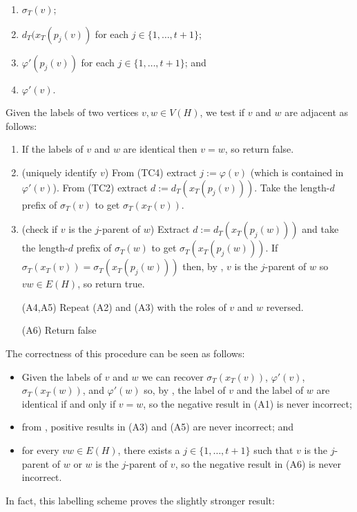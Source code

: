 \documentclass[kpfonts]{patmorin}
\begin{document}
\begin{enumerate}[(TC1)]
  \item $\sigma_T(v)$;
  \item $d_T(x_T(p_j(v))$ for each $j\in\{1,\ldots,t+1\}$; 
  \item $\varphi'(p_j(v))$ for each $j\in\{1,\ldots,t+1\}$; and
  \item $\varphi'(v)$.
\end{enumerate}

Given the labels of two vertices $v,w\in V(H)$, we test if $v$ and $w$ are adjacent as follows:
\begin{enumerate}[({A}1)]
  \item If the labels of $v$ and $w$ are identical then $v=w$, so return false.
  
  \item (uniquely identify $v$) From (TC4) extract $j:=\varphi(v)$ (which is contained in $\varphi'(v)$).  From (TC2) extract $d:=d_T(x_T(p_j(v)))$. Take the length-$d$ prefix of $\sigma_T(v)$ to get $\sigma_T(x_T(v))$.

  \item (check if $v$ is the $j$-parent of $w$) Extract $d:=d_T(x_T(p_j(w)))$ and take the length-$d$ prefix of $\sigma_T(w)$ to get $\sigma_T(x_T(p_j(w)))$.  If $\sigma_T(x_T(v))=\sigma_T(x_T(p_j(w)))$ then, by , $v$ is the $j$-parent of $w$ so $vw\in E(H)$, so return true.
  
  \item[(A4,A5)] Repeat (A2) and (A3) with the roles of $v$ and $w$ reversed.
  
  \item[(A6)] Return false
\end{enumerate}

The correctness of this procedure can be seen as follows:
\begin{itemize}
  \item Given the labels of $v$ and $w$ we can recover $\sigma_T(x_T(v))$, $\varphi'(v)$, $\sigma_T(x_T(w))$, and $\varphi'(w)$ so, by , the label of $v$ and the label of $w$ are identical if and only if $v=w$, so the negative result in (A1) is never incorrect;
  \item from , positive results in (A3) and (A5) are never incorrect; and 
  \item for every $vw\in E(H)$, there exists a $j\in\{1,\ldots,t+1\}$ such that $v$ is the $j$-parent of $w$ or $w$ is the $j$-parent of $v$, so the negative result in (A6) is never incorrect.    
\end{itemize}
In fact, this labelling scheme proves the slightly stronger result:
\end{document}
